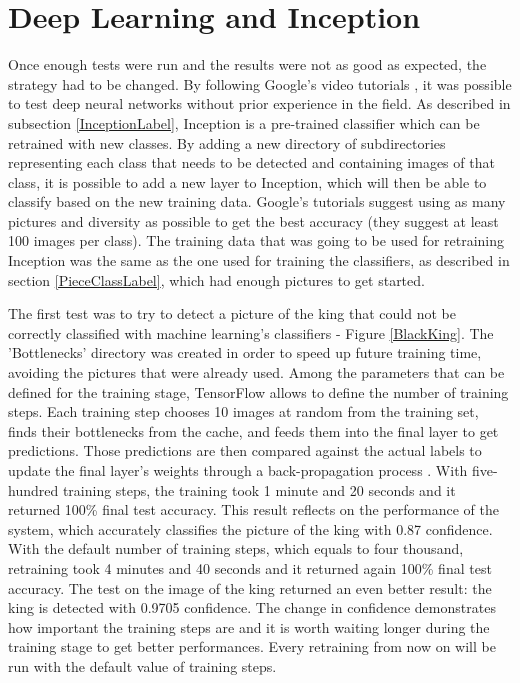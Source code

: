 \documentclass{l4proj}
\begin{document}
\section{Deep Learning and Inception} \label{DeepLearningClassification} 

Once enough tests were run and the results were not as good as expected, the strategy had to be changed. By following Google's video tutorials \cite{TensorFlowYoutubeTutorials}, it was possible to test deep neural networks without prior experience in the field. As described in subsection \ref{InceptionLabel}, Inception is a pre-trained classifier which can be retrained with new classes. By adding a new directory of subdirectories representing each class that needs to be detected and containing images of that class, it is possible to add a new layer to Inception, which will then be able to classify based on the new training data. Google's tutorials suggest using as many pictures and diversity as possible to get the best accuracy (they suggest at least 100 images per class). The training data that was going to be used for retraining Inception was the same as the one used for training the classifiers, as described in section \ref{PieceClassLabel}, which had enough pictures to get started.

The first test was to try to detect a picture of the king that could not be correctly classified with machine learning's classifiers - Figure \ref{BlackKing}. The 'Bottlenecks' directory was created in order to speed up future training time, avoiding the pictures that were already used. Among the parameters that can be defined for the training stage, TensorFlow allows to define the number of training steps. Each training step chooses 10 images at random from the training set, finds their bottlenecks from the cache, and feeds them into the final layer to get predictions. Those predictions are then compared against the actual labels to update the final layer's weights through a back-propagation process \cite{TensorFlowForPoets}. With five-hundred training steps, the training took 1 minute and 20 seconds and it returned 100\% final test accuracy. This result reflects on the performance of the system, which accurately classifies the picture of the king with 0.87 confidence. 
With the default number of training steps, which equals to four thousand, retraining took 4 minutes and 40 seconds and it returned again 100\% final test accuracy. The test on the image of the king returned an even better result: the king is detected with 0.9705 confidence. The change in confidence demonstrates how important the training steps are and it is worth waiting longer during the training stage to get better performances. Every retraining from now on will be run with the default value of training steps.
\end{document}
